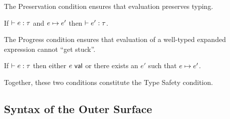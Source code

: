The Preservation condition ensures that evaluation preserves typing.  
\begin{condition}[Preservation]\label{condition:preservation-U} If $\vdash e : \tau$ and $e \mapsto e'$ then $\vdash e' : \tau$. \end{condition}
The Progress condition ensures that evaluation of a well-typed expanded expression cannot ``get stuck''.
\begin{condition}[Progress]\label{condition:progress-U} If $\vdash e : \tau$ then either $e~\mathsf{val}$ or there exists an $e'$ such that $e \mapsto e'$. \end{condition}
Together, these two conditions constitute the Type Safety condition.

\subsection{Syntax of the Outer Surface}\label{sec:syntax-U}
